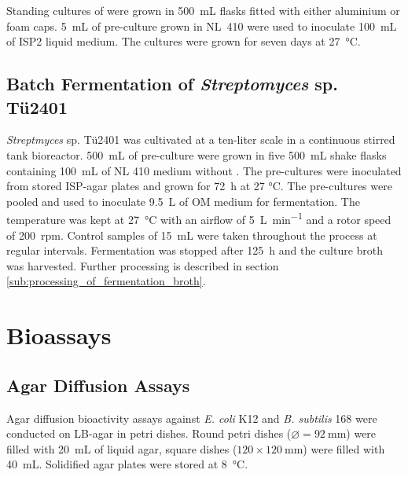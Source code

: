 Standing cultures of \tue were grown in \SI{500}{\milli\liter} flasks fitted with either aluminium or foam caps.
\SI{5}{\milli\liter} of pre-culture grown in NL~410 were used to inoculate \SI{100}{\milli\liter} of ISP2 liquid medium.
The cultures were grown for seven days at \SI{27}{\celsius}.


\subsection{Batch Fermentation of \emph{Streptomyces} sp. Tü2401} %
\label{sub:fermentation}

\textit{Streptmyces} sp. Tü2401 was cultivated at a ten-liter scale in a continuous stirred tank bioreactor.
\SI{500}{\milli\liter} of pre-culture were grown in five \SI{500}{\milli\liter} shake flasks containing \SI{100}{\milli\liter} of NL 410 medium without .
The pre-cultures were inoculated from stored ISP-agar plates and grown for \SI{72}{\hour} at 27 \si{\celsius}.
The pre-cultures were pooled and used to inoculate \SI{9.5}{\liter} of OM medium for fermentation.
The temperature was kept at \SI{27}{\celsius} with an airflow of \SI{5}{\liter\per\minute} and a rotor speed of 200~rpm.
Control samples of \SI{15}{\milli\liter} were taken throughout the process at regular intervals.
Fermentation was stopped after \SI{125}{\hour} and the culture broth was harvested.
Further processing is described in section \ref{sub:processing_of_fermentation_broth}.


\section{Bioassays} %
\label{sec:bioassays}

\subsection{Agar Diffusion Assays} %
\label{sub:agar_diffusion_bioactivity_assays}

Agar diffusion bioactivity assays against \emph{E. coli} K12 and \emph{B. subtilis} 168 were conducted on LB-agar in petri dishes.
Round petri dishes ($\varnothing=\SI{92}{\milli\meter}$) were filled with \SI{20}{\milli\liter} of liquid agar, square dishes ($120\times \SI{120}{\milli\meter}$) were filled with \SI{40}{\milli\liter}.
Solidified agar plates were stored at \SI{8}{\celsius}.

